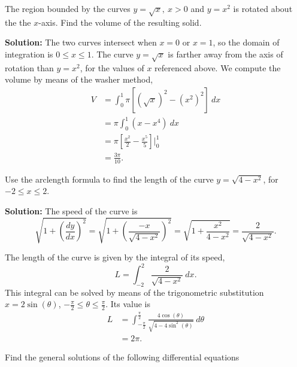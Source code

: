 \documentclass[11pt]{exam}
\begin{document}
\begin{questions}
\newpage
\addpoints
\question[2] The region bounded by the curves $y=\sqrt{x}, \ x>0$ and $y=x^2$ is rotated about the the $x$-axis. Find the volume of the resulting solid. 

\textbf{Solution:} The two curves intersect when $x=0$ or $x=1$, so the domain of integration is $0 \leq x \leq 1$. The curve $y=\sqrt{x}$ is farther away from the axis of rotation than $y=x^2$, for the values of $x$ referenced above. We compute the volume by means of the washer method, 
\begin{align*}
V & = \int_{0}^{1} \pi [(\sqrt{x})^2-(x^2)^2] \ dx \\
& = \pi \int_{0}^{1} (x-x^4) \ dx \\
& = \pi \left[\frac{x^2}{2}-\frac{x^5}{5} \right] \Big|_{0}^{1} \\
& = \frac{3\pi}{10}.
\end{align*}


\newpage
\addpoints
\question[2] Use the arclength formula to find the length of the curve $y=\sqrt{4-x^2}$, for $-2\leq x \leq 2$.

\textbf{Solution:} The speed of the curve is 
\begin{equation*}
\sqrt{1+\left(\frac{dy}{dx}\right)^2} = \sqrt{1+ \left(\frac{-x}{\sqrt{4-x^2}}\right)^2} = \sqrt{1+\frac{x^2}{4-x^2}} =\frac{2}{\sqrt{4-x^2}}.
\end{equation*}

The length of the curve is given by the integral of its speed, 
\begin{equation*}
L  = \int_{-2}^{2} \frac{2}{\sqrt{4-x^2}} \ dx.
\end{equation*}
This integral can be solved by means of the trigonometric substitution $x=2\sin(\theta)$, $-\frac{\pi}{2} \leq \theta \leq \frac{\pi}{2}$. Its value is 
\begin{align*}
L & = \int_{-\frac{\pi}{2}}^{\frac{\pi}{2}} \frac{4\cos(\theta)}{\sqrt{4-4\sin^2(\theta)}} \ d\theta \\
& = 2\pi. 
\end{align*}

\newpage
\addpoints
\question Find the general solutions of the following differential equations
\end{questions}
\end{document}
